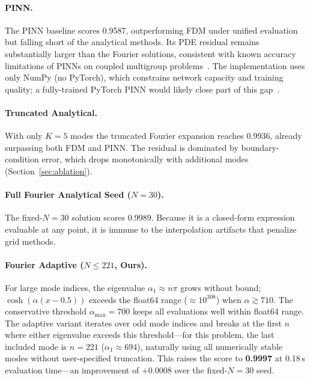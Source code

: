 \paragraph{PINN.}
The PINN baseline scores 0.9587, outperforming FDM under unified evaluation but falling short of the analytical methods. Its PDE residual remains substantially larger than the Fourier solutions, consistent with known accuracy limitations of PINNs on coupled multigroup problems~\cite{raissi2019pinn}. The implementation uses only NumPy (no PyTorch), which constrains network capacity and training quality; a fully-trained PyTorch PINN would likely close part of this gap~\cite{elhareef2022pinn}.

\paragraph{Truncated Analytical.}
With only $K{=}5$ modes the truncated Fourier expansion reaches 0.9936, already surpassing both FDM and PINN. The residual is dominated by boundary-condition error, which drops monotonically with additional modes (Section~\ref{sec:ablation}).

\paragraph{Full Fourier Analytical Seed ($N{=}30$).}
The fixed-$N{=}30$ solution scores 0.9989. Because it is a closed-form expression evaluable at any point, it is immune to the interpolation artifacts that penalize grid methods.

\paragraph{Fourier Adaptive ($N{\leq}221$, Ours).}
For large mode indices, the eigenvalue $\alpha_1 \approx n\pi$ grows without bound; $\cosh(\alpha(x-0.5))$ exceeds the float64 range ($\approx 10^{308}$) when $\alpha \gtrsim 710$. The conservative threshold $\alpha_{\max} = 700$ keeps all evaluations well within float64 range. The adaptive variant iterates over odd mode indices and breaks at the first $n$ where either eigenvalue exceeds this threshold---for this problem, the last included mode is $n{=}221$ ($\alpha_1 \approx 694$), naturally using all numerically stable modes without user-specified truncation. This raises the score to \textbf{0.9997} at 0.18\,s evaluation time---an improvement of $+0.0008$ over the fixed-$N{=}30$ seed.

